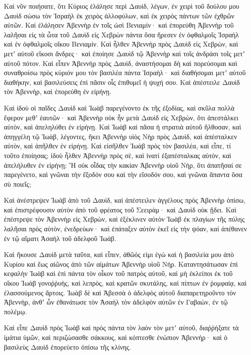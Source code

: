 {Καὶ νῦν ποιήσατε, ὅτι Κύριος ἐλάλησε περὶ Δαυὶδ, λέγων, ἐν χειρὶ τοῦ δούλου μου Δαυὶδ σώσω τὸν Ἰσραὴλ ἐκ χειρὸς ἀλλοφύλων, καὶ ἐκ χειρὸς πάντων τῶν ἐχθρῶν αὐτῶν.
Καὶ ἐλάλησεν Ἀβεννὴρ ἐν τοῖς ὠσὶ Βενιαμίν· καὶ ἐπορεύθη Ἀβεννὴρ τοῦ λαλῆσαι εἰς τὰ ὦτα τοῦ Δαυὶδ εἰς Χεβρὼν πάντα ὅσα ἤρεσεν ἐν ὀφθαλμοῖς Ἰσραὴλ καὶ ἐν ὀφθαλμοῖς οἴκου Βενιαμίν.
Καὶ ἦλθεν Ἀβεννὴρ πρὸς Δαυὶδ εἰς Χεβρὼν, καὶ μετʼ αὐτοῦ εἴκοσι ἄνδρες· καὶ ἐποίησε Δαυὶδ τῷ Ἀβεννὴρ καὶ τοῖς ἀνδράσι τοῖς μετʼ αὐτοῦ πότον.
Καὶ εἶπεν Ἀβεννὴρ πρὸς Δαυὶδ, ἀναστήσομαι δὴ καὶ πορεύσομαι καὶ συναθροίσω πρὸς κύριόν μου τὸν βασιλέα πάντα Ἰσραὴλ· καὶ διαθήσομαι μετʼ αὐτοῦ διαθήκην, καὶ βασιλεύσεις ἐπὶ πᾶσιν οἷς ἐπιθυμεῖ ἡ ψυχή σου. Καὶ ἀπέστειλε Δαυὶδ τὸν Ἀβεννὴρ, καὶ ἐπορεύθη ἐν εἰρήνῃ.
\par }{\PP {}Καὶ ἰδοὺ οἱ παῖδες Δαυὶδ καὶ Ἰωὰβ παρεγένοντο ἐκ τῆς ἐξοδίας, καὶ σκῦλα πολλὰ ἔφερον μεθʼ ἑαυτῶν· καὶ Ἀβεννὴρ οὐκ ἦν μετὰ Δαυὶδ εἰς Χεβρὼν, ὅτι ἀπεστάλκει αὐτὸν, καὶ ἀπεληλύθει ἐν εἰρήνῃ.
Καὶ Ἰωὰβ καὶ πᾶσα ἡ στρατιὰ αὐτοῦ ἤλθοσαν, καὶ ἀπηγγέλη τῷ Ἰωὰβ, λέγοντες, ἥκει Ἀβεννὴρ υἱὸς Νὴρ πρὸς Δαυὶδ, καὶ ἀπέσταλκεν αὐτὸν, καὶ ἀπῆλθεν ἐν εἰρήνῃ.
Καὶ εἰσῆλθεν Ἰωὰβ πρὸς τὸν βασιλέα, καὶ εἶπε, τί τοῦτο ἐποίησας; ἰδοὺ ἦλθεν Ἀβεννὴρ πρὸς σὲ, καὶ ἱνατί ἐξαπέσταλκας αὐτὸν, καὶ ἀπελήλυθεν ἐν εἰρήνῃ;
Ἢ οὐκ οἶδας τὴν κακίαν Ἀβεννὴρ υἱοῦ Νὴρ, ὅτι ἀπατῆσαί σε παρεγένετο, καὶ γνῶναι τὴν ἔξοδόν σου καὶ τὴν εἴσοδόν σου, καὶ γνῶναι ἅπαντα ὅσα σὺ ποιεῖς;
\par }{\PP {}Καὶ ἀνέστρεψεν Ἰωὰβ ἀπὸ τοῦ Δαυὶδ, καὶ ἀπέστειλεν ἀγγέλους πρὸς Ἀβεννὴρ ὀπίσω, καὶ ἐπιστρέφουσιν αὐτὸν ἀπὸ τοῦ φρέατος τοῦ Σεειρὰμ· καὶ Δαυὶδ οὐκ ᾔδει.
Καὶ ἐπέστρεψε τὸν Ἀβεννὴρ εἰς Χεβρὼν, καὶ ἐξέκλινεν αὐτὸν Ἰωὰβ ἐκ πλαγίων τῆς πύλης λαλῆσαι πρὸς αὐτὸν, ἐνεδρεύων· καὶ ἐπάταξεν αὐτὸν ἐκεῖ εἰς τὴν ψόαν, καὶ ἀπέθανεν ἐν τῷ αἵματι Ἀσαὴλ τοῦ ἀδελφοῦ Ἰωάβ.
\par }{\PP {}Καὶ ἤκουσε Δαυὶδ μετὰ ταῦτα, καὶ εἶπεν, ἀθῶός εἰμι ἐγὼ καὶ ἡ βασιλεία μου ἀπὸ Κυρίου καὶ ἕως αἰῶνος ἀπὸ τῶν αἱμάτων Ἀβεννὴρ υἱοῦ Νήρ.
Καταντησάτωσαν ἐπὶ κεφαλὴν Ἰωὰβ καὶ ἐπὶ πάντα τὸν οἶκον τοῦ πατρὸς αὐτοῦ, καὶ μὴ ἐκλείποι ἐκ τοῦ οἴκου Ἰωὰβ γονοῤῥυὴς, καὶ λεπρὸς, καὶ κρατῶν σκυτάλης, καὶ πίπτων ἐν ῥομφαίᾳ, καὶ ἐλασσούμενος ἄρτοις.
Ἰωὰβ δὲ καὶ Ἀβεσσὰ ὁ ἀδελφὸς αὐτοῦ διαπαρετηροῦντο τὸν Ἀβεννὴρ, ἀνθʼ ὧν ἐθανάτωσε τὸν Ἀσαὴλ τὸν ἀδελφὸν αὐτῶν ἐν Γαβαὼν, ἐν τῷ πολέμῳ.
\par }{\PP {}Καὶ εἶπε Δαυὶδ πρὸς Ἰωὰβ καὶ πρὸς πάντα τὸν λαὸν τὸν μετʼ αὐτοῦ, διαῤῥήξατε τὰ ἱμάτια ὑμῶν, καὶ περιζώσασθε σάκκους, καὶ κόπτεσθε ἐνώπιον Ἀβεννήρ· καὶ ὁ βασιλεὺς Δαυὶδ ἐπορεύετο ὀπίσω τῆς κλίνης.
}
